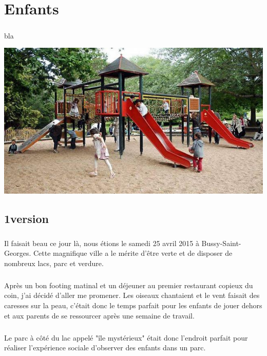 \chapter{Enfants}

\paragraph{}
bla

\begin{center}
	\includegraphics[scale=0.7]{enfants.jpg}
\end{center}

\section{1\iere version}

\paragraph{} Il faisait beau ce jour là, nous étions le samedi 25 avril 2015 à
Bussy-Saint-Georges. Cette magnifique ville a le mérite d'être verte et de
disposer de nombreux lacs, parc et verdure.

\paragraph{} Après un bon footing matinal et un déjeuner au premier restaurant
copieux du coin, j'ai décidé d'aller me promener. Les oiseaux chantaient et le
vent faisait des caresses sur la peau, c'était donc le temps parfait pour les
enfants de jouer dehors et aux parents de se ressourcer après une semaine de
travail.

\paragraph{} Le parc à côté du lac appelé "île mystérieux" était donc l'endroit
parfait pour réaliser l'expérience sociale d'observer des enfants dans un parc.


